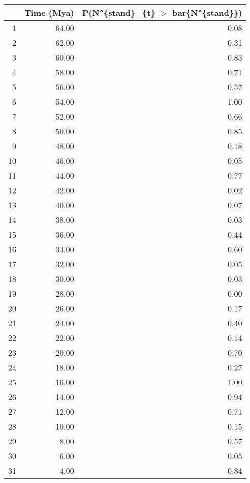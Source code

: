 \begin{table}[ht]
\centering
\begin{tabular}{rrr}
  \hline
 & Time (Mya) & P(N\verb|^|\{stand\}\_\{t\} $>$ bar\{N\verb|^|\{stand\}\}) \\ 
  \hline
1 & 64.00 & 0.08 \\ 
  2 & 62.00 & 0.31 \\ 
  3 & 60.00 & 0.83 \\ 
  4 & 58.00 & 0.71 \\ 
  5 & 56.00 & 0.57 \\ 
  6 & 54.00 & 1.00 \\ 
  7 & 52.00 & 0.66 \\ 
  8 & 50.00 & 0.85 \\ 
  9 & 48.00 & 0.18 \\ 
  10 & 46.00 & 0.05 \\ 
  11 & 44.00 & 0.77 \\ 
  12 & 42.00 & 0.02 \\ 
  13 & 40.00 & 0.07 \\ 
  14 & 38.00 & 0.03 \\ 
  15 & 36.00 & 0.44 \\ 
  16 & 34.00 & 0.60 \\ 
  17 & 32.00 & 0.05 \\ 
  18 & 30.00 & 0.03 \\ 
  19 & 28.00 & 0.00 \\ 
  20 & 26.00 & 0.17 \\ 
  21 & 24.00 & 0.40 \\ 
  22 & 22.00 & 0.14 \\ 
  23 & 20.00 & 0.70 \\ 
  24 & 18.00 & 0.27 \\ 
  25 & 16.00 & 1.00 \\ 
  26 & 14.00 & 0.94 \\ 
  27 & 12.00 & 0.71 \\ 
  28 & 10.00 & 0.15 \\ 
  29 & 8.00 & 0.57 \\ 
  30 & 6.00 & 0.05 \\ 
  31 & 4.00 & 0.84 \\ 
   \hline
\end{tabular}
\label{tab:div_peak}
\end{table}
